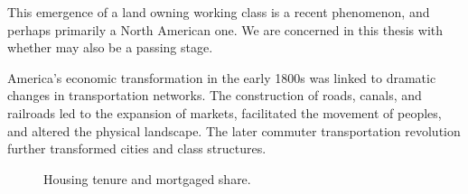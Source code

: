 This emergence of a land owning working class is a recent phenomenon, and perhaps primarily a North American one. We are concerned in this thesis with whether may also be a passing stage.

America's economic transformation in the early 1800s was linked to dramatic changes in transportation networks. The construction of roads, canals, and railroads led to the expansion of markets, facilitated the movement of peoples, and altered the physical landscape. The later commuter transportation revolution further transformed cities and class structures.

\begin{figure}
\begin{center}
\end{center}
\caption{Housing tenure and mortgaged share.}
\label{fig-mortgage-tenure}
\end{figure}
